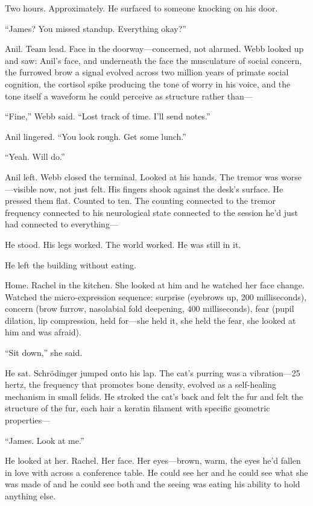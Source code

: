 Two hours. Approximately. He surfaced to someone knocking on his door.

``James? You missed standup. Everything okay?''

Anil. Team lead. Face in the doorway---concerned, not alarmed. Webb looked up and saw: Anil's face, and underneath the face the musculature of social concern, the furrowed brow a signal evolved across two million years of primate social cognition, the cortisol spike producing the tone of worry in his voice, and the tone itself a waveform he could perceive as structure rather than---

``Fine,'' Webb said. ``Lost track of time. I'll send notes.''

Anil lingered. ``You look rough. Get some lunch.''

``Yeah. Will do.''

Anil left. Webb closed the terminal. Looked at his hands. The tremor was worse---visible now, not just felt. His fingers shook against the desk's surface. He pressed them flat. Counted to ten. The counting connected to the tremor frequency connected to his neurological state connected to the session he'd just had connected to everything---

He stood. His legs worked. The world worked. He was still in it.

He left the building without eating.

\bigskip

Home. Rachel in the kitchen. She looked at him and he watched her face change. Watched the micro-expression sequence: surprise (eyebrows up, 200 milliseconds), concern (brow furrow, nasolabial fold deepening, 400 milliseconds), fear (pupil dilation, lip compression, held for---she held it, she held the fear, she looked at him and was afraid).

``Sit down,'' she said.

He sat. Schr\"{o}dinger jumped onto his lap. The cat's purring was a vibration---25 hertz, the frequency that promotes bone density, evolved as a self-healing mechanism in small felids. He stroked the cat's back and felt the fur and felt the structure of the fur, each hair a keratin filament with specific geometric properties---

``James. Look at me.''

He looked at her. Rachel. Her face. Her eyes---brown, warm, the eyes he'd fallen in love with across a conference table. He could see her and he could see what she was made of and he could see both and the seeing was eating his ability to hold anything else.

